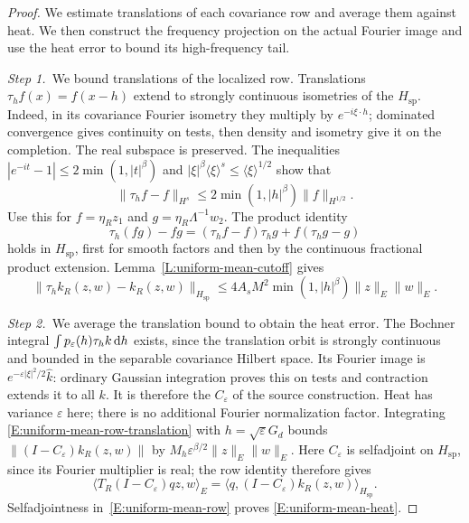 \begin{proof}
  We estimate translations of each covariance row and average them against
  heat. We then construct the frequency projection on the actual Fourier image
  and use the heat error to bound its high-frequency tail.


  \medskip
  \noindent\textit{Step 1.~}We bound translations of the localized row.
  Translations $\tau_hf(x) = f(x-h)$ extend to strongly continuous isometries of
  the $H_{\mathrm{sp}}$. Indeed, in its covariance Fourier isometry they
  multiply by $e^{-i\xi\cdot h}$; dominated convergence gives continuity on
  tests, then density and isometry give it on the completion. The real subspace
  is preserved. The inequalities $|e^{-it}-1| \le 2\min(1,|t|^\beta)$ and
  $|\xi|^\beta\langle\xi\rangle^s \le \langle\xi\rangle^{1/2}$ show that
  \[
    \|\tau_hf-f\|_{H^s}
    \le2\min(1,|h|^\beta)\|f\|_{H^{1/2}} .
  \]
  Use this for $f = \eta_Rz_1$ and $g = \eta_R\Lambda^{-1}w_2$. The product
  identity
  \[
    \tau_h(fg)-fg=(\tau_hf-f)\tau_hg+f(\tau_hg-g)
  \]
  holds in $H_{\mathrm{sp}}$, first for smooth factors and then by the
  continuous fractional product extension. Lemma~\ref{L:uniform-mean-cutoff}
  gives
  \begin{equation}\label{E:uniform-mean-row-translation}
    \|\tau_hk_R(z,w)-k_R(z,w)\|_{H_{\mathrm{sp}}}
    \le4A_sM^2\min(1,|h|^\beta)\|z\|_E\|w\|_E .
  \end{equation}


  \medskip
  \noindent\textit{Step 2.~}We average the translation bound to obtain the
  heat error.
  The Bochner integral $\int p_\varepsilon(h)\tau_hk\,\mathrm{d} h$ exists, since the
  translation orbit is strongly continuous and bounded in the separable
  covariance Hilbert space. Its Fourier image is
  $e^{-\varepsilon|\xi|^2/2}\widehat{k}$: ordinary Gaussian integration proves
  this on tests and contraction extends it to all $k$. It is therefore the
  $C_\varepsilon$ of the source construction. Heat has variance $\varepsilon$
  here; there is no additional Fourier normalization factor. Integrating
  \eqref{E:uniform-mean-row-translation} with $h = \sqrt\varepsilon G_d$ bounds
  $\|(I-C_\varepsilon)k_R(z,w)\|$ by $M_h\varepsilon^{\beta/2}\|z\|_E\|w\|_E$.
  Here $C_\varepsilon$ is selfadjoint on $H_{\mathrm{sp}}$, since its Fourier
  multiplier is real; the row identity therefore gives
  \[
    \langle T_R(I-C_\varepsilon)qz,w\rangle_E
    =\langle q,(I-C_\varepsilon)k_R(z,w)\rangle_{H_{\mathrm{sp}}}.
  \]
  Selfadjointness in~\eqref{E:uniform-mean-row} proves
  \eqref{E:uniform-mean-heat}.


\end{proof}
